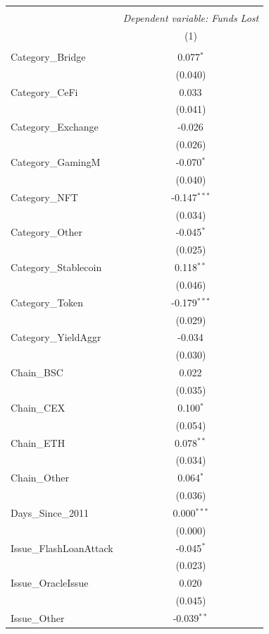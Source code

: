 \begin{table}[!htbp] \centering
\begin{tabular}{@{\extracolsep{5pt}}lc}
\\[-1.8ex]\hline
\hline \\[-1.8ex]
& \multicolumn{1}{c}{\textit{Dependent variable: Funds Lost}} \
\cr \cline{2-2}
\\[-1.8ex] & (1) \\
\hline \\[-1.8ex]
 Category_Bridge & 0.077$^{*}$ \\
& (0.040) \\
 Category_CeFi & 0.033$^{}$ \\
& (0.041) \\
 Category_Exchange & -0.026$^{}$ \\
& (0.026) \\
 Category_GamingM & -0.070$^{*}$ \\
& (0.040) \\
 Category_NFT & -0.147$^{***}$ \\
& (0.034) \\
 Category_Other & -0.045$^{*}$ \\
& (0.025) \\
 Category_Stablecoin & 0.118$^{**}$ \\
& (0.046) \\
 Category_Token & -0.179$^{***}$ \\
& (0.029) \\
 Category_YieldAggr & -0.034$^{}$ \\
& (0.030) \\
 Chain_BSC & 0.022$^{}$ \\
& (0.035) \\
 Chain_CEX & 0.100$^{*}$ \\
& (0.054) \\
 Chain_ETH & 0.078$^{**}$ \\
& (0.034) \\
 Chain_Other & 0.064$^{*}$ \\
& (0.036) \\
 Days_Since_2011 & 0.000$^{***}$ \\
& (0.000) \\
 Issue_FlashLoanAttack & -0.045$^{*}$ \\
& (0.023) \\
 Issue_OracleIssue & 0.020$^{}$ \\
& (0.045) \\
 Issue_Other & -0.039$^{**}$ \\

\end{tabular}
\end{table}
